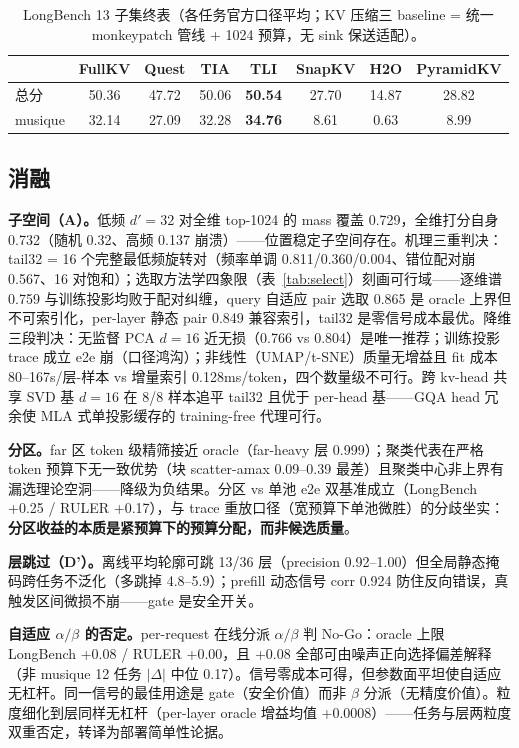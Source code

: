 \documentclass[11pt]{article}
\begin{document}
\begin{table}[h]\centering
\caption{LongBench 13 子集终表（各任务官方口径平均；KV 压缩三 baseline = 统一 monkeypatch 管线 + 1024 预算，无 sink 保送适配）。}
\label{tab:longbench}
\begin{tabular}{lccccccc}
\toprule
 & FullKV & Quest & TIA & TLI & SnapKV & H2O & PyramidKV \\
\midrule
总分 & 50.36 & 47.72 & 50.06 & \textbf{50.54} & 27.70 & 14.87 & 28.82 \\
musique & 32.14 & 27.09 & 32.28 & \textbf{34.76} & 8.61 & 0.63 & 8.99 \\
\bottomrule
\end{tabular}
\end{table}

\subsection{消融}

\textbf{子空间（A）。}低频 $d'{=}32$ 对全维 top-1024 的 mass 覆盖 0.729，全维打分自身 0.732（随机 0.32、高频 0.137 崩溃）——位置稳定子空间存在。机理三重判决：tail32 = 16 个完整最低频旋转对（频率单调 0.811/0.360/0.004、错位配对崩 0.567、16 对饱和）；选取方法学四象限（表~\ref{tab:select}）刻画可行域——逐维谱 0.759 与训练投影均败于配对纠缠，query 自适应 pair 选取 0.865 是 oracle 上界但不可索引化，per-layer 静态 pair 0.849 兼容索引，tail32 是零信号成本最优。降维三段判决：无监督 PCA $d{=}16$ 近无损（0.766 vs 0.804）是唯一推荐；训练投影 trace 成立 e2e 崩（口径鸿沟）；非线性（UMAP/t-SNE）质量无增益且 fit 成本 80--167s/层-样本 vs 增量索引 0.128ms/token，四个数量级不可行。跨 kv-head 共享 SVD 基 $d{=}16$ 在 8/8 样本追平 tail32 且优于 per-head 基——GQA head 冗余使 MLA 式单投影缓存的 training-free 代理可行。

\textbf{分区。}far 区 token 级精筛接近 oracle（far-heavy 层 0.999）；聚类代表在严格 token 预算下无一致优势（块 scatter-amax 0.09--0.39 最差）且聚类中心非上界有漏选理论空洞——降级为负结果。分区 vs 单池 e2e 双基准成立（LongBench +0.25 / RULER +0.17），与 trace 重放口径（宽预算下单池微胜）的分歧坐实：\textbf{分区收益的本质是紧预算下的预算分配，而非候选质量}。

\textbf{层跳过（D'）。}离线平均轮廓可跳 13/36 层（precision 0.92--1.00）但全局静态掩码跨任务不泛化（多跳掉 4.8--5.9）；prefill 动态信号 corr 0.924 防住反向错误，真触发区间微损不崩——gate 是安全开关。

\textbf{自适应 $\alpha/\beta$ 的否定。}per-request 在线分派 $\alpha/\beta$ 判 No-Go：oracle 上限 LongBench +0.08 / RULER +0.00，且 +0.08 全部可由噪声正向选择偏差解释（非 musique 12 任务 $|\Delta|$ 中位 0.17）。信号零成本可得，但参数面平坦使自适应无杠杆。同一信号的最佳用途是 gate（安全价值）而非 $\beta$ 分派（无精度价值）。粒度细化到层同样无杠杆（per-layer oracle 增益均值 +0.0008）——任务与层两粒度双重否定，转译为部署简单性论据。
\end{document}
